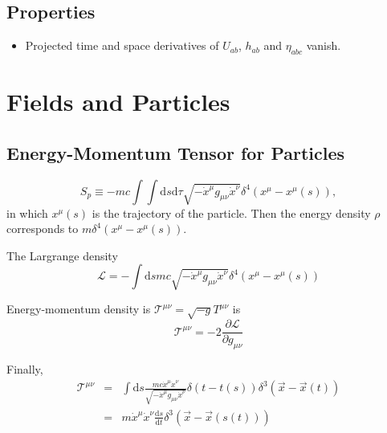 \subsection{Properties}

\begin{itemize}
	\item 
Projected time and space derivatives of $U_{ab}$, $h_{ab}$ and $\eta_{abc}$ vanish.
\end{itemize}



















\section{Fields and Particles}

\subsection{Energy-Momentum Tensor for Particles}

\begin{equation}
S_p \equiv -m c \int \int \mathrm d s\mathrm d\tau \sqrt{-\dot x ^\mu g_{\mu\nu} \dot x^\nu} \delta^4(x^\mu - x^\mu (s))    ,
\end{equation}
in which $x^\mu(s)$ is the trajectory of the particle. Then the energy density $\rho$ corresponds to $m\delta^4(x^\mu- x^\mu(s))$.

The Largrange density
\begin{equation}
\mathcal L = -\int\mathrm ds mc \sqrt{-\dot x^\mu g_{\mu\nu}\dot x^\nu}\delta^4(x^\mu - x^\mu(s))
\end{equation}

Energy-momentum density is $\mathcal T^{\mu\nu} = \sqrt{-g}T^{\mu\nu}$ is
\begin{equation} 
\mathcal T^{\mu\nu} = -2 \frac{\partial \mathcal L}{\partial g_{\mu\nu}}
\end{equation}

Finally,
\begin{eqnarray}
\mathcal T^{\mu\nu} &=& \int \mathrm ds \frac{mc\dot x^\mu \dot x^\nu}{\sqrt{-\dot x^\mu g_{\mu\nu} \dot x^\nu}} \delta(t-t(s))\delta^3(\vec x - \vec x(t)) \\
&=& m\dot x^\mu \dot x^\nu \frac{\mathrm d s}{\mathrm d t} \delta^3(\vec x - \vec x(s(t)))
\end{eqnarray}






